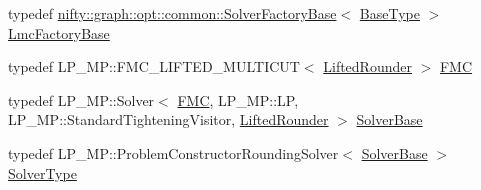 \begin{DoxyCompactItemize}
\item 
typedef \hyperlink{classnifty_1_1graph_1_1opt_1_1common_1_1SolverFactoryBase}{nifty\+::graph\+::opt\+::common\+::\+Solver\+Factory\+Base}$<$ \hyperlink{classnifty_1_1graph_1_1opt_1_1lifted__multicut_1_1LiftedMulticutMp_a7e49c98a298643cc17c1732827b64243}{Base\+Type} $>$ \hyperlink{classnifty_1_1graph_1_1opt_1_1lifted__multicut_1_1LiftedMulticutMp_a5631d9599ac12e7a2541b89da09d3782}{Lmc\+Factory\+Base}
\item 
typedef L\+P\+\_\+\+M\+P\+::\+F\+M\+C\+\_\+\+L\+I\+F\+T\+E\+D\+\_\+\+M\+U\+L\+T\+I\+C\+UT$<$ \hyperlink{structnifty_1_1graph_1_1opt_1_1lifted__multicut_1_1LiftedMulticutMp_1_1LiftedRounder}{Lifted\+Rounder} $>$ \hyperlink{classnifty_1_1graph_1_1opt_1_1lifted__multicut_1_1LiftedMulticutMp_a001fa87667c60e36d940d411c59fe2d0}{F\+MC}
\item 
typedef L\+P\+\_\+\+M\+P\+::\+Solver$<$ \hyperlink{classnifty_1_1graph_1_1opt_1_1lifted__multicut_1_1LiftedMulticutMp_a001fa87667c60e36d940d411c59fe2d0}{F\+MC}, L\+P\+\_\+\+M\+P\+::\+LP, L\+P\+\_\+\+M\+P\+::\+Standard\+Tightening\+Visitor, \hyperlink{structnifty_1_1graph_1_1opt_1_1lifted__multicut_1_1LiftedMulticutMp_1_1LiftedRounder}{Lifted\+Rounder} $>$ \hyperlink{classnifty_1_1graph_1_1opt_1_1lifted__multicut_1_1LiftedMulticutMp_ab91bee4414d7854c428bba8f7aadac1f}{Solver\+Base}
\item 
typedef L\+P\+\_\+\+M\+P\+::\+Problem\+Constructor\+Rounding\+Solver$<$ \hyperlink{classnifty_1_1graph_1_1opt_1_1lifted__multicut_1_1LiftedMulticutMp_ab91bee4414d7854c428bba8f7aadac1f}{Solver\+Base} $>$ \hyperlink{classnifty_1_1graph_1_1opt_1_1lifted__multicut_1_1LiftedMulticutMp_a6ff7bb4eee8d2296d5a6e38340bdd90e}{Solver\+Type}
\end{DoxyCompactItemize}
